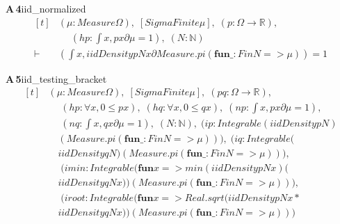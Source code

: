 \documentclass[conference]{IEEEtran}
\theoremstyle{definition}
\newcommand{\lean}[1]{\textsf{\footnotesize #1}}
\begin{document}
\noindent\textbf{A\,4}\quad\lean{iid\_normalized}
{\footnotesize\[ \begin{aligned}[t]
&(\mu : \mathit{Measure} \Omega ),\; [\mathit{SigmaFinite} \mu ],\; (\mathit{p} : \Omega \to \mathbb{R} ),\\
&\quad \; (\mathit{hp} : \int \mathit{x}, \mathit{p} \mathit{x} ∂\mu = 1),\; (\mathit{N} : \mathbb{N} )\\
\vdash\;&(\int \mathit{x}, \mathit{iidDensity} \mathit{p} \mathit{N} \mathit{x} ∂\mathit{Measure}.\mathit{pi} (\mathbf{fun} \mathit{\_} : \mathit{Fin} \mathit{N} => \mu )) = 1
\end{aligned} \]}

\noindent\textbf{A\,5}\quad\lean{iid\_testing\_bracket}
{\footnotesize\[ \begin{aligned}[t]
&(\mu : \mathit{Measure} \Omega ),\; [\mathit{SigmaFinite} \mu ],\; (\mathit{p} \mathit{q} : \Omega \to \mathbb{R} ),\\
&\quad \; (\mathit{hp} : \forall \mathit{x}, 0 \leq \mathit{p} \mathit{x}),\; (\mathit{hq} : \forall \mathit{x}, 0 \leq \mathit{q} \mathit{x}),\; (\mathit{np} : \int \mathit{x}, \mathit{p} \mathit{x} ∂\mu = 1),\\
&\quad \; (\mathit{nq} : \int \mathit{x}, \mathit{q} \mathit{x} ∂\mu = 1),\; (\mathit{N} : \mathbb{N} ),\; (\mathit{ip} : \mathit{Integrable} (\mathit{iidDensity} \mathit{p} \mathit{N})\\
&\quad (\mathit{Measure}.\mathit{pi} (\mathbf{fun} \mathit{\_} : \mathit{Fin} \mathit{N} => \mu ))),\; (\mathit{iq} : \mathit{Integrable} (\\
&\quad \mathit{iidDensity} \mathit{q} \mathit{N}) (\mathit{Measure}.\mathit{pi} (\mathbf{fun} \mathit{\_} : \mathit{Fin} \mathit{N} => \mu ))),\\
&\quad \; (\mathit{imin} : \mathit{Integrable} (\mathbf{fun} \mathit{x} => \mathit{min} (\mathit{iidDensity} \mathit{p} \mathit{N} \mathit{x}) (\\
&\quad \mathit{iidDensity} \mathit{q} \mathit{N} \mathit{x})) (\mathit{Measure}.\mathit{pi} (\mathbf{fun} \mathit{\_} : \mathit{Fin} \mathit{N} => \mu ))),\\
&\quad \; (\mathit{iroot} : \mathit{Integrable} (\mathbf{fun} \mathit{x} => \mathit{Real}.\mathit{sqrt} (\mathit{iidDensity} \mathit{p} \mathit{N} \mathit{x}*\\
&\quad \mathit{iidDensity} \mathit{q} \mathit{N} \mathit{x})) (\mathit{Measure}.\mathit{pi} (\mathbf{fun} \mathit{\_} : \mathit{Fin} \mathit{N} => \mu )))\\

\end{aligned}\]}
\end{document}
